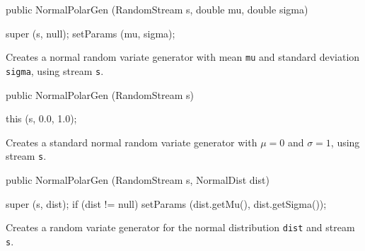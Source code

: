 \begin{code}

   public NormalPolarGen (RandomStream s, double mu, double sigma) \begin{hide} {
      super (s, null);
      setParams (mu, sigma);
   }\end{hide}
\end{code}
\begin{tabb}  Creates a normal random variate generator with mean \texttt{mu}
  and standard deviation \texttt{sigma}, using stream \texttt{s}.
\end{tabb}
\begin{code}

   public NormalPolarGen (RandomStream s) \begin{hide} {
      this (s, 0.0, 1.0);
   }\end{hide}
\end{code}
\begin{tabb}  Creates a standard normal random variate generator with $\mu = 0$
 and $\sigma=1$, using stream \texttt{s}.
\end{tabb}
\begin{code}

   public NormalPolarGen (RandomStream s, NormalDist dist) \begin{hide} {
      super (s, dist);
      if (dist != null)
         setParams (dist.getMu(), dist.getSigma());
   }\end{hide}
\end{code}
 \begin{tabb} Creates a random variate generator for
  the normal distribution \texttt{dist} and stream \texttt{s}.
 \end{tabb}


